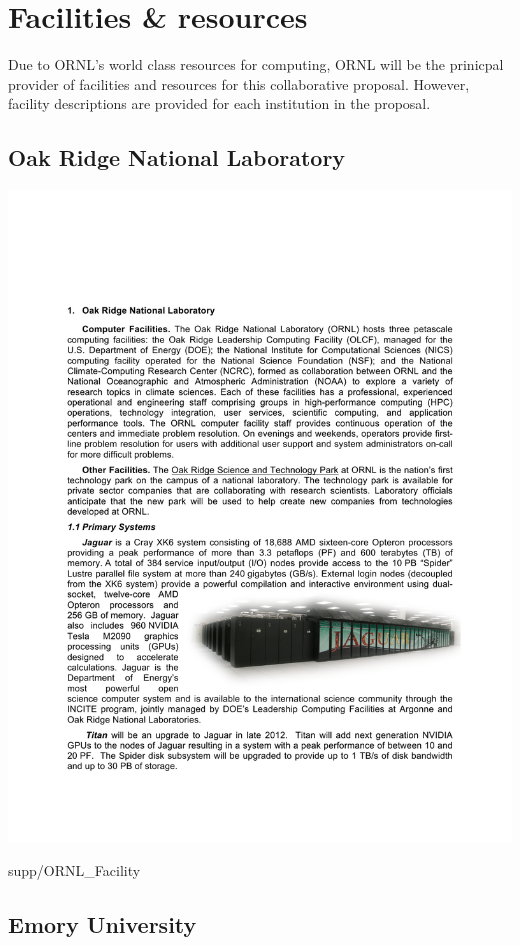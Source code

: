 
\section{Facilities \& resources}

Due to ORNL's world class resources for computing, ORNL will be the prinicpal
provider of facilities and resources for this collaborative proposal.
However, facility descriptions are provided for each institution in the
proposal. 
%
\nopagebreak
\subsection{Oak Ridge National Laboratory}
\begin{center}
\includegraphics[scale=0.965]{supp/ORNL_fac1}
\end{center}


{supp/ORNL_Facility}

\subsection{Emory University}


\pagebreak
\endinput


